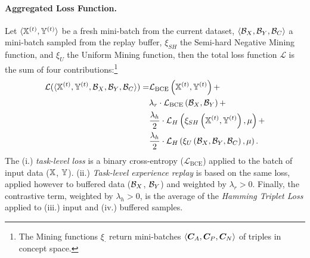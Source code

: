 \paragraph{Aggregated Loss Function.} Let $\langle{\mathbb{X}}^{(t)}, {\mathbb{Y}}^{(t)}\rangle$ be a fresh mini-batch from the current dataset, $\langle{\mathcal{B}}_X, {\mathcal{B}}_Y, {\mathcal{B}}_C\rangle$ a mini-batch sampled from the replay buffer, $\xi_{SH}$ the Semi-hard Negative Mining function, and $\xi_{U}$ the Uniform Mining function, then the total loss function $\mathcal{L}$ is the sum of four contributions:\footnote{The Mining functions $\xi_\cdot$ return mini-batches $\langle{\bm{C}}_A, {\bm{C}}_P, {\bm{C}}_N\rangle$ of triples in concept space.}
\begin{align*}
	\mathcal{L}(\langle {\mathbb{X}}^{(t)}, {\mathbb{Y}}^{(t)}, {\mathcal{B}}_X, {\mathcal{B}}_Y, {\mathcal{B}}_C \rangle) =&  \mathcal{L}_{\mathrm{BCE}}\left({\mathbb{X}}^{(t)}, {\mathbb{Y}}^{(t)}\right) + \\
	& \lambda_r \cdot \mathcal{L}_{\mathrm{BCE}}\left({\mathcal{B}}_X, {\mathcal{B}}_Y\right) + \\
	&\frac{\lambda_h}{2} \cdot \mathcal{L}_H\left(\xi_{SH}\left({\mathbb{X}}^{(t)}, {\mathbb{Y}}^{(t)}\right), \mu\right) +\\
	&\frac{\lambda_h}{2} \cdot \mathcal{L}_{H}\left(\xi_{U}\left({\mathcal{B}}_X, {\mathcal{B}}_Y, {\mathcal{B}}_C\right), \mu\right).
	\label{cem:eq:loss}  
\end{align*}
The (i.) \textit{task-level loss} is a binary cross-entropy ($\mathcal{L}_{\mathrm{BCE}}$) applied to the batch of input data (${\mathbb{X}}$, ${\mathbb{Y}}$). (ii.) \textit{Task-level experience replay} is based on the same loss, applied however to buffered data (${\mathcal{B}}_X$, ${\mathcal{B}}_Y$) and weighted by $\lambda_r > 0$. Finally, the contrastive term, weighted by $\lambda_h > 0$, is the average of the \textit{Hamming Triplet Loss} applied to (iii.) input and (iv.) buffered samples.

